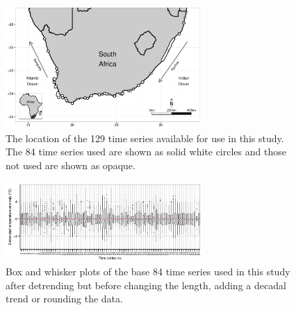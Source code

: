 \documentclass[]{ametsoc}
\begin{document}





%
\begin{figure}
\centering \includegraphics[width=7.5cm]{figure01}
\caption[\small The location of the 129 time series available for use in this study]{The location of the 129 time series available for use in this study. The 84 time series used are shown as solid white circles and those not used are shown as opaque.}
\label{figure01}
\end{figure}

\begin{figure}
\centering \includegraphics[width=7.5cm]{figure00}
\caption[\small Box and whisker plots of the base 84 time series]{Box and whisker plots of the base 84 time series used in this study after detrending but before changing the length, adding a decadal trend or rounding the data.}
\label{figure00}
\end{figure}
\end{document}
